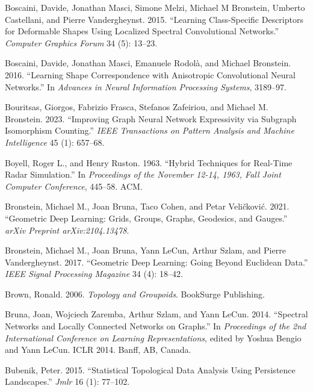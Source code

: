 \documentclass[
  12pt,
]{krantz}
\newlength{\cslhangindent}
\newenvironment{CSLReferences}[2] %
 {\begin{list}{}{%
  \setlength{\itemindent}{0pt}
  \setlength{\leftmargin}{0pt}
  \setlength{\parsep}{0pt}
  \ifodd #1
   \setlength{\leftmargin}{\cslhangindent}
   \setlength{\itemindent}{-1\cslhangindent}
  \fi
  \setlength{\itemsep}{#2\baselineskip}}}
 {\end{list}}
\begin{document}
\begin{CSLReferences}{1}{0}
Boscaini, Davide, Jonathan Masci, Simone Melzi, Michael M Bronstein,
Umberto Castellani, and Pierre Vandergheynst. 2015. {``Learning
Class-Specific Descriptors for Deformable Shapes Using Localized
Spectral Convolutional Networks.''} \emph{Computer Graphics Forum} 34
(5): 13--23.

Boscaini, Davide, Jonathan Masci, Emanuele Rodolà, and Michael
Bronstein. 2016. {``Learning Shape Correspondence with Anisotropic
Convolutional Neural Networks.''} In \emph{Advances in Neural
Information Processing Systems}, 3189--97.

Bouritsas, Giorgos, Fabrizio Frasca, Stefanos Zafeiriou, and Michael M.
Bronstein. 2023. {``Improving Graph Neural Network Expressivity via
Subgraph Isomorphism Counting.''} \emph{IEEE Transactions on Pattern
Analysis and Machine Intelligence} 45 (1): 657--68.

Boyell, Roger L., and Henry Ruston. 1963. {``Hybrid Techniques for
Real-Time Radar Simulation.''} In \emph{Proceedings of the November
12-14, 1963, Fall Joint Computer Conference}, 445--58. ACM.

Bronstein, Michael M., Joan Bruna, Taco Cohen, and Petar Veličković.
2021. {``Geometric Deep Learning: Grids, Groups, Graphs, Geodesics, and
Gauges.''} \emph{arXiv Preprint arXiv:2104.13478}.

Bronstein, Michael M., Joan Bruna, Yann LeCun, Arthur Szlam, and Pierre
Vandergheynst. 2017. {``Geometric Deep Learning: Going Beyond
{E}uclidean Data.''} \emph{IEEE Signal Processing Magazine} 34 (4):
18--42.

Brown, Ronald. 2006. \emph{Topology and Groupoids}. BookSurge
Publishing.

Bruna, Joan, Wojciech Zaremba, Arthur Szlam, and Yann LeCun. 2014.
{``Spectral Networks and Locally Connected Networks on Graphs.''} In
\emph{Proceedings of the 2nd International Conference on Learning
Representations}, edited by Yoshua Bengio and Yann LeCun. {ICLR} 2014.
Banff, AB, Canada.

Bubenik, Peter. 2015. {``Statistical Topological Data Analysis Using
Persistence Landscapes.''} \emph{Jmlr} 16 (1): 77--102.


\end{CSLReferences}
\end{document}
